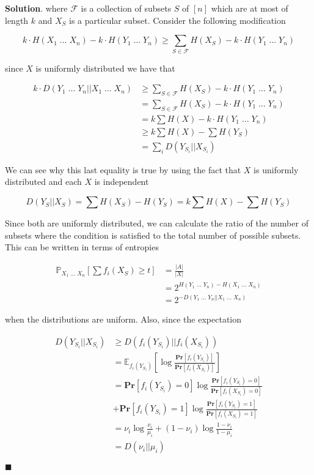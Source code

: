 \documentclass[12pt]{article}
\theoremstyle{definition}
\newenvironment{s}{%
        \begin{trivlist} \item \textbf{Solution}. }{%
            \hspace*{\fill} $\blacksquare$\end{trivlist}}%
\begin{document}
{\begin{s}
where $\mathcal{F}$ is a collection of subsets  $S$ of $[n]$ which are at most of length $k$ and $X_{S}$ is a particular subset. Consider the following modification

\begin{equation*}
k\cdot H(X_{1} \; ... \; X_{n}) - k\cdot H(Y_{1} \; ... \; Y_{n})\geq  \sum_{S\in \mathcal{F}} H(X_{S}) - k\cdot H(Y_{1} \; ... \; Y_{n}) 
\end{equation*}

since $X$ is uniformly distributed we have that

\begin{align*}
k\cdot D(Y_{1} \; ... \; Y_{n}||X_{1} \; ... \; X_{n}) &\geq \sum_{S\in \mathcal{F}} H(X_{S}) - k\cdot H(Y_{1} \; ... \; Y_{n}) \\
&= \sum_{S\in \mathcal{F}} H(X_{S})  - k\cdot H(Y_{1} \; ... \; Y_{n}) \\
&= k\sum H(X)  - k\cdot H(Y_{1} \; ... \; Y_{n}) \\
&\geq k\sum H(X)  - \sum H(Y_{S})\\
&= \sum_{i} D(Y_{S_{i}}||X_{S_{i}}) 
\end{align*}

We can see why this last equality is true by using the fact that $X$ is uniformly distributed and each $X$ is independent

\begin{equation*}
D(Y_{S}||X_{S})  = \sum H(X_{S}) - H(Y_{S}) = k\sum H(X) - \sum H(Y_{S})
\end{equation*}

Since both are uniformly distributed, we can calculate the ratio of the number of subsets where the condition is satisfied to the total number of possible subsets. This can be written in terms of entropies

\begin{align*}
\mathbb{P}_{X_{1}\; ... \; X_{n}} \left[\sum f_{i}(X_{S}) \geq t\right] &= \frac{|A|}{|X|} \\
&= 2^{H(Y_{1} \; ... \; Y_{n}) - H(X_{1} \; ... \; X_{n})}\\
&= 2^{-D(Y_{1} \; ... \; Y_{n}||X_{1} \; ... \; X_{n})}
\end{align*}

when the distributions are uniform. Also, since the expectation 

\begin{align*}
D(Y_{S_{i}}||X_{S_{i}}) &\geq D(f_{i}(Y_{S_{i}})||f_{i}(X_{S_{i}})) \\
&= \mathbb{E}_{f_{i}(Y_{S_{i}})}\left[\log\frac{\mathbf{Pr}[f_{i}(Y_{S_{i}})]}{\mathbf{Pr}[f_{i}(X_{S_{i}})]} \right]\\
&= \mathbf{Pr}[f_{i}(Y_{S_{i}})=0]\log\frac{\mathbf{Pr}[f_{i}(Y_{S_{i}})=0]}{\mathbf{Pr}[f_{i}(X_{S_{i}})=0]} \\
&+ \mathbf{Pr}[f_{i}(Y_{S_{i}})=1]\log\frac{\mathbf{Pr}[f_{i}(Y_{S_{i}})=1]}{\mathbf{Pr}[f_{i}(X_{S_{i}})=1]}\\
&= \nu_{i}\log \frac{\nu_{i}}{\mu_{i}} + (1-\nu_{i})\log \frac{1-\nu_{i}}{1-\mu_{i}}\\
&= D(\nu_{i}||\mu_{i})
\end{align*}


\end{s}}
\end{document}

